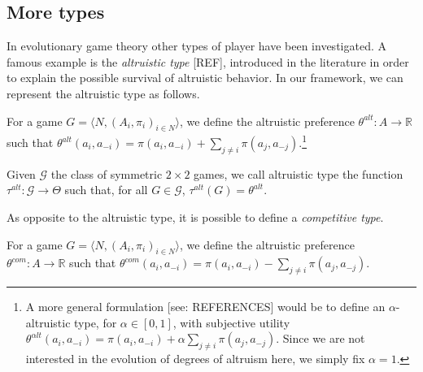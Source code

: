 \documentclass[fleqn,reqno,11pt]{article}
\begin{document}
\subsection{More types}
\label{sec:more-types}


In evolutionary game theory other types of player have been investigated. A famous example is the \textit{altruistic type} [REF], introduced in the literature in order to explain the possible survival of altruistic behavior. In our framework, we can represent the altruistic type as follows. 

\begin{definition} \label{defn:altpref}

For a game $ G=\langle N, (A_i , \pi_i)_{i \in N} \rangle $, we define the altruistic preference $ \theta^{alt}: A \rightarrow \mathbb{R} $ such that $ \theta^{alt}(a_i,a_{-i})=\pi(a_i,a_{-i}) + \sum_{j \neq i} \pi(a_{j},a_{-j})$.\footnote{A more general formulation [see: REFERENCES] would be to define an $ \alpha$-altruistic type, for $\alpha \in [0,1]$, with subjective utility $ \theta^{\alpha lt}(a_i,a_{-i})=\pi(a_i,a_{-i}) + \alpha \sum_{j \neq i} \pi(a_{j},a_{-j})$. Since we are not interested in the evolution of degrees of altruism here, we simply fix $ \alpha = 1 $.}

\end{definition}

\begin{definition} \label{defn:alttype}

Given $ \mathcal{G} $ the class of symmetric $ 2 \times 2 $ games, we call altruistic type the function $\tau^{alt}: \mathcal{G} \rightarrow  \Theta$ such that, for all $G \in \mathcal{G}$, $ \tau^{alt}(G)= \theta^{alt}$.

\end{definition}

\noindent As opposite to the altruistic type, it is possible to define a \textit{competitive type}. 

\begin{definition} \label{defn:compref}

For a game $ G=\langle N, (A_i , \pi_i)_{i \in N} \rangle $, we define the altruistic preference $ \theta^{com}: A \rightarrow \mathbb{R} $ such that $ \theta^{com}(a_i,a_{-i})=\pi(a_i,a_{-i}) - \sum_{j \neq i} \pi(a_{j},a_{-j})$.

\end{definition}
\end{document}
